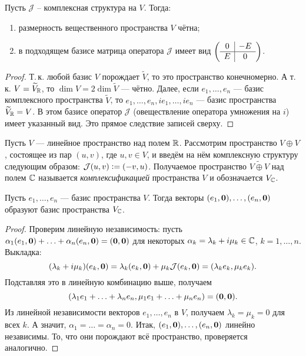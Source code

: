 \begin{proposal}
    Пусть $\mathcal{J}$ -- комплексная структура на $V$. Тогда:
    \begin{enumerate}[nolistsep]
        \item размерность вещественного пространства $V$ чётна;
        \item в подходящем базисе матрица оператора $\mathcal{J}$ имеет вид
            $
            \left(
            \begin{array}{c | c}
                0 & -E\\
                \hline
                E & 0
            \end{array}
            \right)
            $.
    \end{enumerate}
\end{proposal}

\begin{proof}
    Т.\,к. любой базис $V$ порождает $\widetilde{V}$, то это пространство конечномерно. А т.\,к. $V = \widetilde{V}_{\mathbb{R}}$, то $\dim V = 2\dim\widetilde{V}$ --- чётно. Далее, если $e_1, \ldots, e_n$ --- базис комплексного пространства $\widetilde{V}$, то $e_1, \ldots, e_n, ie_1, \ldots, ie_n$ --- базис пространства $\widetilde{V}_{\mathbb{R}} = V$. В этом базисе оператор $\mathcal{J}$ (овеществление оператора умножения на $i$) имеет указанный вид. Это прямое следствие записей сверху.
\end{proof}

\begin{definition}
    Пусть $V$ --- линейное пространство над полем $\mathbb{R}$. Рассмотрим пространство $V \oplus V$, состоящее из пар $(u, v)$, где $u, v \in V$, и введём на нём комплексную структуру следующим образом: $\mathcal{J}(u, v) \vcentcolon = (-v, u)$. Получаемое пространство $\widetilde{V \oplus V}$ над полем $\mathbb{C}$ называется \textit{комплексификацией} пространства $V$ и обозначается $V_{\mathbb{C}}$.
\end{definition}

\begin{proposal}
    Пусть $e_1, \ldots, e_n$ --- базис пространства $V$. Тогда векторы $(e_1, \boldsymbol{0}), \ldots, (e_n, \boldsymbol{0})$ образуют базис пространства $V_{\mathbb{C}}$.
\end{proposal}

\begin{proof}
    Проверим линейную независимость: пусть $\alpha_1(e_1, \boldsymbol{0}) + \ldots + \alpha_n(e_n, \boldsymbol{0}) = (\boldsymbol{0}, \boldsymbol{0})$ для некоторых $\alpha_k = \lambda_k + i\mu_k \in \mathbb{C}$, $k = 1, \ldots, n$. Выкладка:
    \[
        (\lambda_k + i\mu_k)(e_k, \boldsymbol{0}) = \lambda_k(e_k, \boldsymbol{0}) + \mu_k\mathcal{J}(e_k, \boldsymbol{0}) = (\lambda_ke_k, \mu_ke_k).
    \]
    Подставляя это в линейную комбинацию выше, получаем \[(\lambda_1e_1 + \ldots + \lambda_ne_n, \mu_1e_1 + \ldots + \mu_ne_n) = (\boldsymbol{0}, \boldsymbol{0}).\]
    Из линейной независимости векторов $e_1, \ldots, e_n$ в $V$, получаем $\lambda_k = \mu_k = 0$ для всех $k$. А значит, $\alpha_1 = \ldots = \alpha_n = 0$. Итак, $(e_1, \boldsymbol{0}), \ldots, (e_n, \boldsymbol{0})$ линейно независимы. То, что они порождают всё пространство, проверяется аналогично.
\end{proof}

